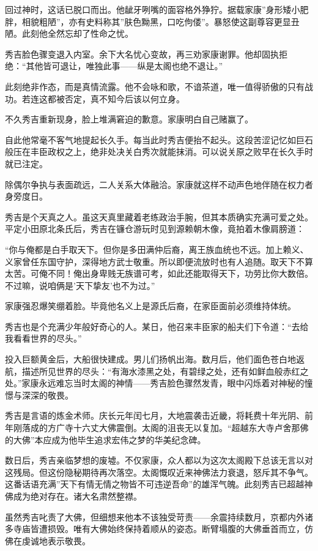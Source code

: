 \documentclass[
]{book}
\begin{document}
回过神时，这话已脱口而出。他龇牙咧嘴的面容格外狰狞。据载家康''身形矮小肥胖，相貌粗陋''，亦有史料称其''肤色黝黑，口吃佝偻''。暴怒使这副尊容更显丑陋。此刻他全然忘却了性命之忧。

秀吉脸色骤变退入内室。余下大名忧心变故，再三劝家康谢罪。他却固执拒绝：``其他皆可退让，唯独此事------纵是太阁也绝不退让。''

此刻绝非作态，而是真情流露。他不会咏和歌，不谙茶道，唯一值得骄傲的只有战功。若连这都被否定，真不知今后该以何立身。

不久秀吉重新现身，脸上堆满窘迫的歉意。家康明白自己赌赢了。

自此他常毫不客气地提起长久手。每当此时秀吉便抬不起头。这段苦涩记忆如巨石般压在丰臣政权之上，绝非处决关白秀次就能抹消。可以说关原之败早在长久手时就已注定。

除偶尔争执与表面疏远，二人关系大体融洽。家康就这样不动声色地伴随在权力者身旁度日。

秀吉是个天真之人。虽这天真里藏着老练政治手腕，但其本质确实充满可爱之处。平定小田原北条氏后，秀吉在镰仓游玩时见到源赖朝木像，竟拍着木像肩膀道：

``你与俺都是白手取天下。但你是多田满仲后裔，离王族血统也不远。加上赖义、义家曾任东国守护，深得地方武士敬重。所以即便流放时也有人追随。取天下不算太苦。可俺不同！俺出身卑贱无族谱可考，如此还能取得天下，功劳比你大数倍。不过嘛，说咱俩是'天下挚友'也不为过。''

家康强忍爆笑绷着脸。毕竟他名义上是源氏后裔，在家臣面前必须维持体统。

秀吉也是个充满少年般好奇心的人。某日，他召来丰臣家的船夫们下令道：``去给我看看世界的尽头。''

投入巨额黄金后，大船很快建成。男儿们扬帆出海。数月后，他们面色苍白地返航，描述所见世界的尽头：``有海水漆黑之处，有碧绿之处，还有如鲜血般赤红之处。''家康永远难忘当时太阁的神情------秀吉脸色骤然发青，眼中闪烁着对神秘的憧憬与深深的敬畏。

秀吉是言语的炼金术师。庆长元年闰七月，大地震袭击近畿，将耗费十年光阴、前年刚落成的方广寺十六丈大佛震倒。太阁的沮丧无以复加。``超越东大寺卢舍那佛的大佛''本应成为他毕生追求宏伟之梦的华美纪念碑。

数日后，秀吉亲临梦想的废墟。不仅家康，众人都以为这次太阁殿下总该无言以对这残局。但这份隐秘期待再次落空。太阁慨叹近来神佛法力衰退，怒斥其不争气。这番话语充满''天下有情无情之物皆不可违逆吾命''的雄浑气魄。此刻秀吉已超越神佛成为绝对存在。诸大名肃然整襟。

虽然秀吉叱责了大佛，但细想来他本不该独受苛责------余震持续数月，京都内外诸多寺庙皆遭损毁。唯有大佛始终保持着顺从的姿态。断臂塌腹的大佛垂首而立，仿佛在虔诚地表示敬畏。
\end{document}
